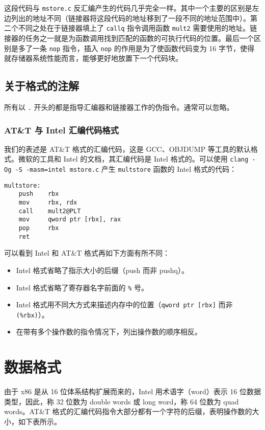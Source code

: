 这段代码与 \verb|mstore.c| 反汇编产生的代码几乎完全一样。其中一个主要的区别是左边列出的地址不同（链接器将这段代码的地址移到了一段不同的地址范围中）。第二个不同之处在于链接器填上了 \verb|callq| 指令调用函数 \verb|mult2| 需要使用的地址。链接器的任务之一就是为函数调用找到匹配的函数的可执行代码的位置。最后一个区别是多了一条 \verb|nop| 指令，插入 \verb|nop| 的作用是为了使函数代码变为 16 字节，使得就存储器系统性能而言，能够更好地放置下一个代码块。

\subsection{关于格式的注解}

所有以 \verb|.| 开头的都是指导汇编器和链接器工作的伪指令。通常可以忽略。

\subsubsection{AT\&T 与 Intel 汇编代码格式}

我们的表述是 AT\&T 格式的汇编代码，这是 GCC、OBJDUMP 等工具的默认格式。微软的工具和 Intel 的文档，其汇编代码是 Intel 格式的。可以使用 \verb|clang -Og -S -masm=intel mstore.c| 产生 \verb|multstore| 函数的 Intel 格式的代码：

\begin{verbatim}
multstore:
    push    rbx
    mov     rbx, rdx
    call    mult2@PLT
    mov     qword ptr [rbx], rax
    pop     rbx
    ret
\end{verbatim}

可以看到 Intel 和 AT\&T 格式再如下方面有所不同：

\begin{itemize}
    \item Intel 格式省略了指示大小的后缀（push 而非 pushq）。
    \item Intel 格式省略了寄存器名字前面的 \verb|%| 号。
    \item Intel 格式用不同大方式来描述内存中的位置（\verb|qword ptr [rbx]| 而非 \verb|(%rbx)|）。
    \item 在带有多个操作数的指令情况下，列出操作数的顺序相反。
\end{itemize}

\section{数据格式}

由于 x86 是从 16 位体系结构扩展而来的，Intel 用术语字（word）表示 16 位数据类型，因此，称 32 位数为 double words 或 long word，称 64 位数为 quad words。AT\&T 格式的汇编代码指令大部分都有一个字符的后缀，表明操作数的大小，如下表所示。


